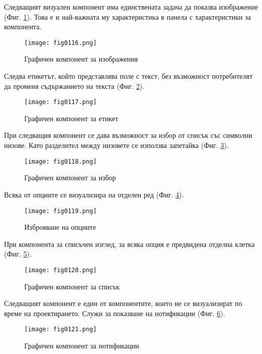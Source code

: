 Следващият визуален компонент има единствената задача да показва изображение (Фиг. \ref{fig0116}). Това е и най-важната му характеристика в панела с характеристики за компонента.

\begin{figure}[H]
  \centering
  \texttt{[image: fig0116.png]}
  \caption{Графичен компонент за изображения}
\label{fig0116}
\end{figure}

Следва етикетът, който представлява поле с текст, без възможност потребителят да променя съдържанието на текста (Фиг. \ref{fig0117}).

\begin{figure}[H]
  \centering
  \texttt{[image: fig0117.png]}
  \caption{Графичен компонент за етикет}
\label{fig0117}
\end{figure}

При следващия компонент се дава възможност за избор от списък със символни низове. Като разделител между низовете се използва запетайка (Фиг. \ref{fig0118}).

\begin{figure}[H]
  \centering
  \texttt{[image: fig0118.png]}
  \caption{Графичен компонент за избор}
\label{fig0118}
\end{figure}

Всяка от опциите се визуализира на отделен ред (Фиг. \ref{fig0119}).

\begin{figure}[H]
  \centering
  \texttt{[image: fig0119.png]}
  \caption{Изброяване на опциите}
\label{fig0119}
\end{figure}

При компонента за списъчен изглед, за всяка опция е предвидена отделна клетка (Фиг. \ref{fig0120}).

\begin{figure}[H]
  \centering
  \texttt{[image: fig0120.png]}
  \caption{Графичен компонент за списък}
\label{fig0120}
\end{figure}

Следващият компонент е един от компонентите, които не се визуализират по време на проектирането. Служи за показване на нотификации (Фиг. \ref{fig0121}).

\begin{figure}[H]
  \centering
  \texttt{[image: fig0121.png]}
  \caption{Графичен компонент за нотификации}
\label{fig0121}
\end{figure}

